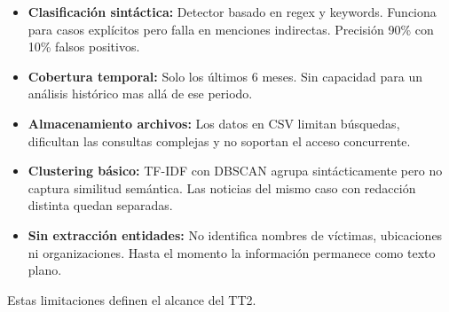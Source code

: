 \begin{itemize}
    \item \textbf{Clasificación sintáctica:} Detector basado en regex y keywords. Funciona para casos explícitos pero falla en menciones indirectas. Precisión 90\% con 10\% falsos positivos.
    
    \item \textbf{Cobertura temporal:} Solo los últimos 6 meses. Sin capacidad para un análisis histórico mas allá de ese periodo.
    
    \item \textbf{Almacenamiento archivos:} Los datos en CSV limitan búsquedas, dificultan las consultas complejas y no soportan el acceso concurrente.
    
    \item \textbf{Clustering básico:} TF-IDF con DBSCAN agrupa sintácticamente pero no captura similitud semántica. Las noticias del mismo caso con redacción distinta quedan separadas.
    
    \item \textbf{Sin extracción entidades:} No identifica nombres de víctimas, ubicaciones ni organizaciones. Hasta el momento la información permanece como texto plano.
\end{itemize}

Estas limitaciones definen el alcance del TT2.

